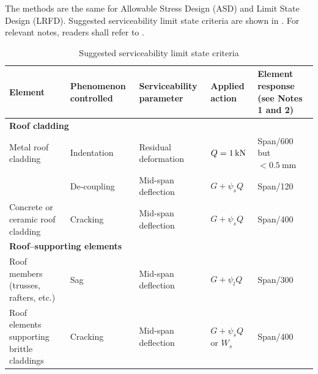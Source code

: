 The methods are the same for Allowable Stress Design (ASD) and Limit State Design (LRFD). Suggested serviceability limit state criteria are shown in . For relevant notes, readers shall refer to .
\begin{table}
\centering\scriptsize
\caption{Suggested serviceability limit state criteria}\label{tab:serviceability_criteria}\renewcommand{\arraystretch}{.85}
\begin{tabular}{lllll}
	\toprule
	\textbf{Element}                                                 & \textbf{Phenomenon controlled}        & \textbf{Serviceability parameter} & \textbf{Applied action}     & \textbf{Element response (see Notes 1 and 2)} \\ \midrule
	\multicolumn{5}{l}{\textbf{Roof cladding}}                                                                                                                                                                                 \\ \midrule
	Metal roof cladding                                              & Indentation                           & Residual deformation              & $Q=\SI{1}{\kilo\newton}$             & Span/600 but $<\SI{0.5}{\mm}$                 \\
	                                                                 & De-coupling                           & Mid-span deflection               & $G+\psi_sQ$                 & Span/120                                      \\
	Concrete or ceramic roof cladding                                & Cracking                              & Mid-span deflection               & $G+\psi_sQ$                 & Span/400                                      \\ \midrule
	\multicolumn{5}{l}{\textbf{Roof--supporting elements}}                                                                                                                                                                     \\ \midrule
	Roof members (trusses, rafters, etc.)                            & Sag                                   & Mid-span deflection               & $G+\psi_lQ$                 & Span/300                                      \\
	Roof elements supporting brittle claddings                       & Cracking                              & Mid-span deflection               & $G+\psi_sQ$ or $W_s$        & Span/400                                      \\ \midrule

\end{tabular}
\end{table}
